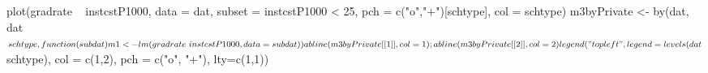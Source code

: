 \begin{Schunk}
\begin{Sinput}
 plot(gradrate ~ instcstP1000, data = dat, subset = instcstP1000 < 25, pch = c("o","+")[schtype], col = schtype)
 m3byPrivate <- by(dat, dat$schtype, function(subdat){m1 <- lm(gradrate ~ instcstP1000, data = subdat)})
 abline(m3byPrivate[[1]], col = 1); abline(m3byPrivate[[2]], col = 2)
 legend("topleft", legend = levels(dat$schtype), col = c(1,2),  pch = c("o", "+"), lty=c(1,1))
\end{Sinput}
\end{Schunk}
